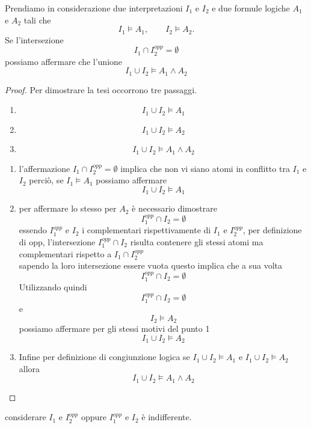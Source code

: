    \begin{thm}
       Prendiamo in considerazione due interpretazioni $I_1$ e $I_2$ e due formule logiche $A_1$ e $A_2$ tali che 
    \[I_1 \models A_1, \qquad I_2 \models A_2.\]
    Se l'intersezione 
    \[I_1 \cap I_2^{opp} = \emptyset\] 
    possiamo affermare che l'unione \[I_1 \cup I_2 \models A_1 \land A_2\]
   \end{thm}
   \begin{proof}
            Per dimostrare la tesi occorrono tre passaggi.
        \begin{enumerate}
            \item \[I_1 \cup I_2 \models A_1\]
            \item \[I_1 \cup I_2 \models A_2\]
            \item \[I_1 \cup I_2 \models A_1 \land A_2\]
        \end{enumerate}
        \begin{enumerate}
            \item l'affermazione $I_1 \cap I_2^{opp} = \emptyset$ implica che non vi siano atomi in conflitto tra $I_1$ e $I_2$ perciò, se $I_1 \models A_1$ possiamo affermare 
               \[I_1 \cup I_2 \models A_1\]
            \item per affermare lo stesso per $A_2$ è necessario dimostrare
            \[I_1^{opp} \cap I_2 = \emptyset\] 
            essendo $I_1^{opp}$ e $I_2$ i complementari rispettivamente di $I_1$ e $I_2^{opp}$, per definizione di opp, l'intersezione $I_1^{opp} \cap I_2$ risulta contenere gli stessi atomi ma complementari rispetto a $I_1 \cap I_2^{opp}$\\
            sapendo la loro intersezione essere vuota questo implica che a sua volta \[I_1^{opp} \cap I_2 = \emptyset\]
            Utilizzando quindi 
            \[I_1^{opp} \cap I_2 = \emptyset\]
            e
            \[I_2 \models A_2\]
            possiamo affermare per gli stessi motivi del punto 1
            \[I_1 \cup I_2 \models A_2\]
            \item Infine per definizione di congiunzione logica se $I_1 \cup I_2 \models A_1$ e $I_1 \cup I_2 \models A_2$ allora \[I_1 \cup I_2 \models A_1 \land A_2\] 
        \end{enumerate}
   \end{proof}
   
       \begin{rem}
         considerare $I_1$ e $I_2^{opp}$ oppure $I_1^{opp}$ e $I_2$ è indifferente.
    \end{rem}

